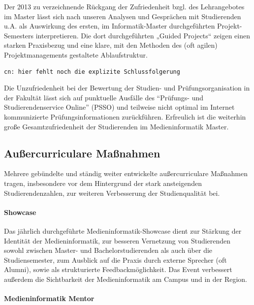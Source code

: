 Der 2013 zu verzeichnende Rückgang der Zufriedenheit bzgl. des
Lehrangebotes im Master lässt sich nach unseren Analysen und Gesprächen
mit Studierenden u.A. als Auswirkung des ersten, im Informatik-Master
durchgeführten Projekt-Semesters interpretieren. Die dort durchgeführten
„Guided Projects`` zeigen einen starken Praxisbezug und eine klare, mit
den Methoden des (oft agilen) Projektmanagements gestaltete
Ablaufstruktur.

\begin{verbatim}
cn: hier fehlt noch die explizite Schlussfolgerung
\end{verbatim}

Die Unzufriedenheit bei der Bewertung der Studien- und
Prüfungsorganisation in der Fakultät lässt sich auf punktuelle Ausfälle
des ``Prüfungs- und Studierendenservice Online'' (PSSO) und teilweise
nicht optimal im Internet kommunizierte Prüfungsinformationen
zurückführen. Erfreulich ist die weiterhin große Gesamtzufriedenheit der
Studierenden im Medieninformatik Master.

\subsection{Außercurriculare
Maßnahmen}\label{auuxdfercurriculare-mauxdfnahmen}

Mehrere gebündelte und ständig weiter entwickelte außercurriculare
Maßnahmen tragen, insbesondere vor dem Hintergrund der stark
ansteigenden Studierendenzahlen, zur weiteren Verbesserung der
Studienqualität bei.

\paragraph{Showcase}\label{showcase}

Das jährlich durchgeführte Medieninformatik-Showcase dient zur Stärkung
der Identität der Medieninformatik, zur besseren Vernetzung von
Studierenden sowohl zwischen Master- und Bachelorstudierenden als auch
über die Studiensemester, zum Ausblick auf die Praxis durch externe
Sprecher (oft Alumni), sowie als strukturierte Feedbackmöglichkeit. Das
Event verbessert außerdem die Sichtbarkeit der Medieninformatik am
Campus und in der Region.

\paragraph{Medieninformatik Mentor}\label{medieninformatik-mentor}

